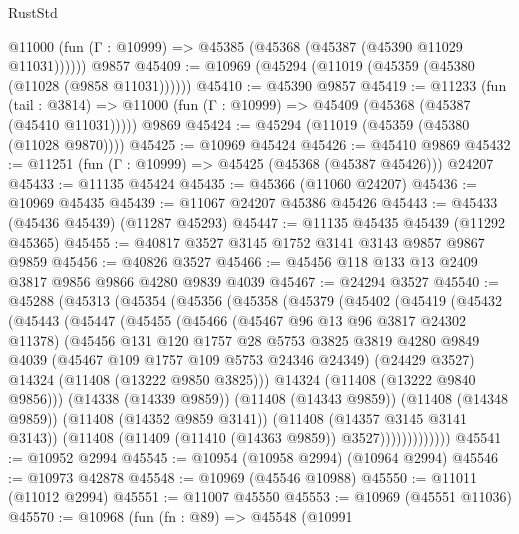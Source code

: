 \begin{lexlean}{RustStd}
\begin{coremodule}
      @11000 (fun (Γ : @10999) => @45385 (@45368 (@45387 (@45390 @11029 @11031))))))
    @9857
@45409 := @10969 (@45294 (@11019 (@45359 (@45380 (@11028 (@9858 @11031))))))
@45410 := @45390 @9857
@45419 := @11233
    (fun (tail : @3814) => @11000 (fun (Γ : @10999) => @45409 (@45368 (@45387 (@45410 @11031)))))
    @9869
@45424 := @45294 (@11019 (@45359 (@45380 (@11028 @9870))))
@45425 := @10969 @45424
@45426 := @45410 @9869
@45432 := @11251 (fun (Γ : @10999) => @45425 (@45368 (@45387 @45426))) @24207
@45433 := @11135 @45424
@45435 := @45366 (@11060 @24207)
@45436 := @10969 @45435
@45439 := @11067 @24207 @45386 @45426
@45443 := @45433 (@45436 @45439) (@11287 @45293)
@45447 := @11135 @45435 @45439 (@11292 @45365)
@45455 := @40817 @3527 @3145 @1752 @3141 @3143 @9857 @9867 @9859
@45456 := @40826 @3527
@45466 := @45456 @118 @133 @13 @2409 @3817 @9856 @9866 @4280 @9839 @4039
@45467 := @24294 @3527
@45540 := @45288
    (@45313
      (@45354
        (@45356
          (@45358
            (@45379
              (@45402
                (@45419
                  (@45432
                    (@45443
                      (@45447
                        (@45455
                          (@45466
                            (@45467 @96 @13 @96 @3817 @24302 @11378)
                            (@45456
                              @131
                              @120
                              @1757
                              @28
                              @5753
                              @3825
                              @3819
                              @4280
                              @9849
                              @4039
                              (@45467 @109 @1757 @109 @5753 @24346 @24349)
                              (@24429 @3527)
                              @14324
                              (@11408 (@13222 @9850 @3825)))
                            @14324
                            (@11408 (@13222 @9840 @9856)))
                          (@14338 (@14339 @9859))
                          (@11408 (@14343 @9859))
                          (@11408 (@14348 @9859))
                          (@11408 (@14352 @9859 @3141))
                          (@11408 (@14357 @3145 @3141 @3143))
                          (@11408 (@11409 (@11410 (@14363 @9859)) @3527)))))))))))))
@45541 := @10952 @2994
@45545 := @10954 (@10958 @2994) (@10964 @2994)
@45546 := @10973 @42878
@45548 := @10969 (@45546 @10988)
@45550 := @11011 (@11012 @2994)
@45551 := @11007 @45550
@45553 := @10969 (@45551 @11036)
@45570 := @10968
    (fun (fn : @89) =>
    @45548
      (@10991

\end{coremodule}
\end{lexlean}

